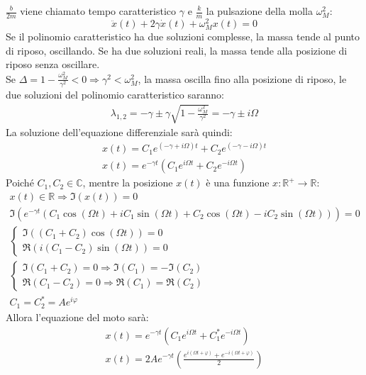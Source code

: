 \documentclass{article}
\numberwithin{equation}{subsection}
\begin{document}
$\displaystyle\frac{b}{2m}$ viene chiamato tempo caratteristico 
$\gamma$ e $\displaystyle\frac{k}{m}$ 
la pulsazione della molla $\omega_M^{2}$:
\begin{equation}
    \ddot x(t)+2\gamma\dot x(t)+\omega_M^{2}x(t)=0
\end{equation}
Se il polinomio caratteristico ha due soluzioni complesse, 
la massa tende al punto di riposo, oscillando. Se ha 
due soluzioni reali, la massa tende alla posizione di riposo 
senza oscillare.\\
Se $\Delta=1-\displaystyle\frac{\omega_M^{2}}{\gamma^{2}} <0\Rightarrow \gamma^{2} < \omega_M^{2}$, 
la massa oscilla fino alla posizione di riposo, le due 
soluzioni del polinomio caratteristico saranno:
\begin{gather*}
    \lambda_{1,2}=-\gamma\pm\gamma\sqrt{1-\displaystyle\frac{\omega_M^{2}}{\gamma^{2}}}=-\gamma\pm i\Omega
\end{gather*}
La soluzione dell'equazione differenziale sarà quindi:
\begin{gather*}
    \displaystyle x(t)=C_1e^{\left(-\gamma+ i\Omega\right)t}+C_2e^{\left(-\gamma- i\Omega\right)t}\\
    x(t)=e^{-\gamma t}\left(C_1e^{i\Omega t}+C_2e^{-i\Omega t}\right)
\end{gather*}
Poiché $C_1,C_2\in\mathbb{C}$, mentre la posizione $x(t)$ è una funzione $x:\mathbb{R}^+\to\mathbb{R}$:
\begin{gather*}
    x(t)\in\mathbb{R}\Rightarrow \Im(x(t))=0\\
    \Im\left(e^{-\gamma t}(C_1\cos(\Omega t)+iC_1\sin(\Omega t)+C_2\cos(\Omega t)-iC_2\sin(\Omega t))\right)=0\\
    \begin{cases}
        \Im((C_1+C_2)\cos(\Omega t))=0\\
        \Re(i(C_1-C_2)\sin(\Omega t))=0
    \end{cases}\\ 
    \begin{cases}
        \Im(C_1+C_2)=0\Rightarrow \Im(C_1)=-\Im(C_2)\\
        \Re(C_1-C_2)=0\Rightarrow \Re(C_1)=\Re(C_2)
    \end{cases}\\ 
    C_1=C_2^{*}=Ae^{i\varphi}
\end{gather*}
Allora l'equazione del moto sarà:
\begin{gather*}
    x(t)=e^{-\gamma t}(C_1e^{i\Omega t}+C_1^*e^{-i\Omega t})\\
    x(t)=2Ae^{-\gamma t}\left(\displaystyle\frac{e^{i(\Omega t+\varphi)}+e^{-i(\Omega t+\varphi)}}{2}\right)\\
\end{gather*}
\end{document}
